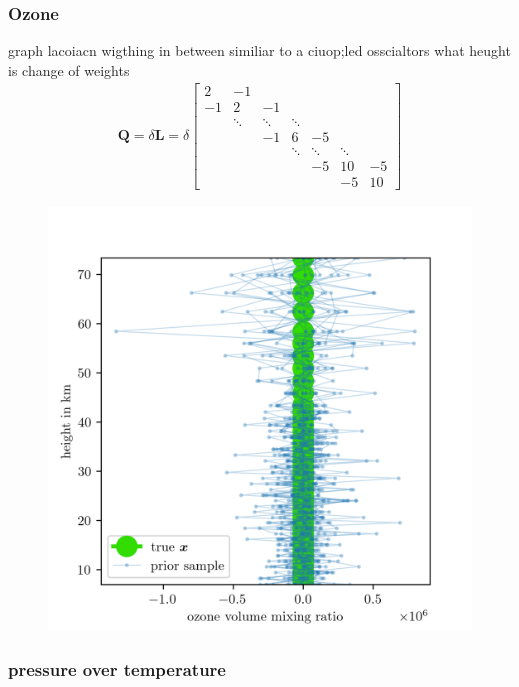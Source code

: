 \subsubsection{Ozone}
graph lacoiacn 
wigthing in between
similiar to a ciuop;led osscialtors
what heught is change of weights
\begin{align}
	\bm{Q}= \delta \bm{L} =
	\delta
	\begin{bmatrix}
		2 & -1 & & &  \\
		-1 & 2 & -1 & &   \\
		& \ddots & \ddots & \ddots &\\ 
		&   & -1 & 6 & -5 \\
		& & & \ddots & \ddots & \ddots  \\ 
		& & & &  -5 & 10 & -5 \\
		& & & & & -5 & 10 
	\end{bmatrix}  
\end{align}
\begin{figure}[ht!]
	\centering
	\includegraphics{OzonePrior.png}
	\caption[]{}
	\label{fig:O3Prior}
\end{figure}
\subsubsection{pressure over temperature}


